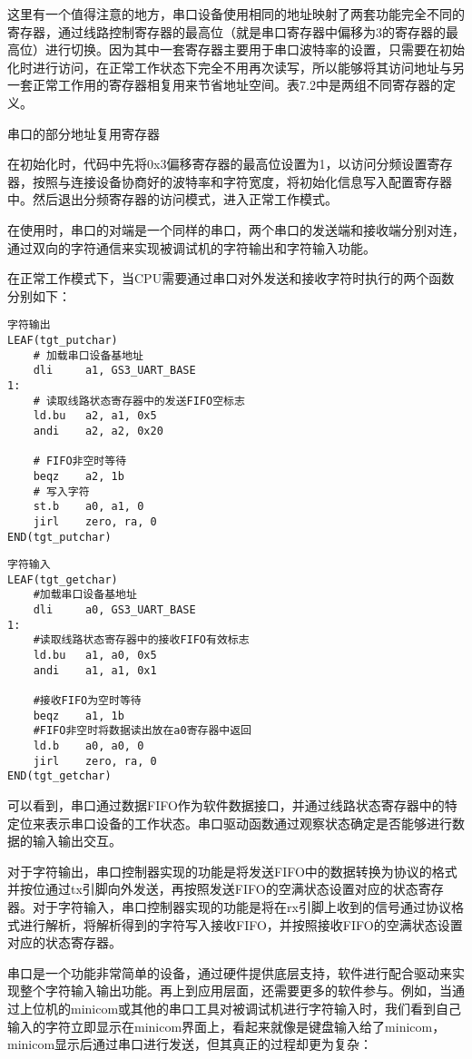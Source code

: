 \documentclass[]{ctexbook}
\begin{document}
这里有一个值得注意的地方，串口设备使用相同的地址映射了两套功能完全不同的寄存器，通过线路控制寄存器的最高位（就是串口寄存器中偏移为3的寄存器的最高位）进行切换。因为其中一套寄存器主要用于串口波特率的设置，只需要在初始化时进行访问，在正常工作状态下完全不用再次读写，所以能够将其访问地址与另一套正常工作用的寄存器相复用来节省地址空间。表7.2中是两组不同寄存器的定义。

\label{tab:reg-multiplex}串口的部分地址复用寄存器

在初始化时，代码中先将0x3偏移寄存器的最高位设置为1，以访问分频设置寄存器，按照与连接设备协商好的波特率和字符宽度，将初始化信息写入配置寄存器中。然后退出分频寄存器的访问模式，进入正常工作模式。

在使用时，串口的对端是一个同样的串口，两个串口的发送端和接收端分别对连，通过双向的字符通信来实现被调试机的字符输出和字符输入功能。

在正常工作模式下，当CPU需要通过串口对外发送和接收字符时执行的两个函数分别如下：

\begin{verbatim}
字符输出
LEAF(tgt_putchar)
    # 加载串口设备基地址
    dli     a1, GS3_UART_BASE
1:
    # 读取线路状态寄存器中的发送FIFO空标志
    ld.bu   a2, a1, 0x5
    andi    a2, a2, 0x20

    # FIFO非空时等待
    beqz    a2, 1b
    # 写入字符
    st.b    a0, a1, 0
    jirl    zero, ra, 0
END(tgt_putchar)
\end{verbatim}

\begin{verbatim}
字符输入
LEAF(tgt_getchar)
    #加载串口设备基地址
    dli     a0, GS3_UART_BASE
1:
    #读取线路状态寄存器中的接收FIFO有效标志
    ld.bu   a1, a0, 0x5
    andi    a1, a1, 0x1

    #接收FIFO为空时等待
    beqz    a1, 1b
    #FIFO非空时将数据读出放在a0寄存器中返回
    ld.b    a0, a0, 0
    jirl    zero, ra, 0
END(tgt_getchar)
\end{verbatim}

可以看到，串口通过数据FIFO作为软件数据接口，并通过线路状态寄存器中的特定位来表示串口设备的工作状态。串口驱动函数通过观察状态确定是否能够进行数据的输入输出交互。

对于字符输出，串口控制器实现的功能是将发送FIFO中的数据转换为协议的格式并按位通过tx引脚向外发送，再按照发送FIFO的空满状态设置对应的状态寄存器。对于字符输入，串口控制器实现的功能是将在rx引脚上收到的信号通过协议格式进行解析，将解析得到的字符写入接收FIFO，并按照接收FIFO的空满状态设置对应的状态寄存器。

串口是一个功能非常简单的设备，通过硬件提供底层支持，软件进行配合驱动来实现整个字符输入输出功能。再上到应用层面，还需要更多的软件参与。例如，当通过上位机的minicom或其他的串口工具对被调试机进行字符输入时，我们看到自己输入的字符立即显示在minicom界面上，看起来就像是键盘输入给了minicom，minicom显示后通过串口进行发送，但其真正的过程却更为复杂：
\end{document}
